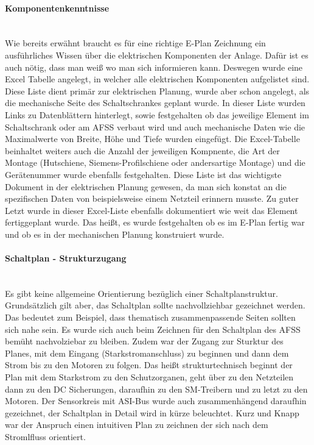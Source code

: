     \paragraph{Komponentenkenntnisse}\mbox{}\\
    Wie bereits erwähnt braucht es für eine richtige E-Plan Zeichnung ein ausführliches Wissen über die elektrischen Komponenten der Anlage. Dafür ist es auch nötig, dass man weiß wo man sich informieren kann. Deswegen wurde eine Excel Tabelle angelegt, in welcher alle elektrischen Komponenten aufgelistet sind. Diese Liste dient primär zur elektrischen Planung, wurde aber schon angelegt, als die mechanische Seite des Schaltschrankes geplant wurde. In dieser Liste wurden Links zu Datenblättern hinterlegt, sowie festgehalten ob das jeweilige Element im Schaltschrank oder am AFSS verbaut wird und auch mechanische Daten wie die Maximalwerte von Breite, Höhe und Tiefe wurden eingefügt. Die Excel-Tabelle beinhaltet weiters auch die Anzahl der jeweiligen Kompnente, die Art der Montage (Hutschiene, Siemens-Profilschiene oder andersartige Montage) und die Gerätenummer wurde ebenfalls festgehalten. Diese Liste ist das wichtigste Dokument in der elektrischen Planung gewesen, da man sich konstat an die spezifischen Daten von beispielsweise einem Netzteil erinnern musste. Zu guter Letzt wurde in dieser Excel-Liste ebenfalls dokumentiert wie weit das Element fertiggeplant wurde. Das heißt, es wurde festgehalten ob es im E-Plan fertig war und ob es in der mechanischen Planung konstruiert wurde.
    \paragraph{Schaltplan - Strukturzugang}\mbox{}\\
    Es gibt keine allgemeine Orientierung bezüglich einer Schaltplanstruktur. Grundsätzlich gilt aber, das Schaltplan sollte nachvollziehbar gezeichnet werden. Das bedeutet zum Beispiel, dass thematisch zusammenpassende Seiten sollten sich nahe sein. Es wurde sich auch beim Zeichnen für den Schaltplan des AFSS bemüht nachvolziebar zu bleiben. Zudem war der Zugang zur Sturktur des Planes, mit dem Eingang (Starkstromanschluss) zu beginnen und dann dem Strom bis zu den Motoren zu folgen. Das heißt strukturtechnisch beginnt der Plan mit dem Starkstrom zu den Schutzorganen, geht über zu den Netzteilen dann zu den DC Sicherungen, daraufhin zu den SM-Treibern und zu letzt zu den Motoren. Der Sensorkreis mit ASI-Bus wurde auch zusammenhängend daraufhin gezeichnet, der Schaltplan in Detail wird in kürze beleuchtet. Kurz und Knapp war der Anspruch einen intuitiven Plan zu zeichnen der sich nach dem Stromlfluss orientiert. 
